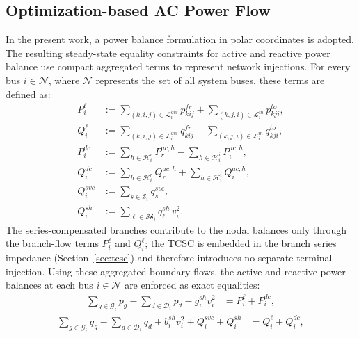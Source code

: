 \documentclass[letterpaper,journal]{IEEEtran}
\begin{document}
\subsection{Optimization-based AC Power Flow}
\label{sec:OB-ACPF}
In the present work, a power balance formulation in polar coordinates is adopted. The resulting steady-state equality constraints for active
and reactive power balance use compact aggregated terms to represent network injections. For every bus $i \in \mathcal{N}$, where $\mathcal{N}$
represents the set of all system buses, these terms are defined as:
\begin{align}
	P_i^{\ell} & := \sum_{(k,i,j)\in\mathcal{L}_i^{out}} p^{fr}_{kij} + \sum_{(k,j,i)\in\mathcal{L}_i^{in}}  p^{to}_{kji},   \\
	Q_i^{\ell} & := \sum_{(k,i,j)\in\mathcal{L}_i^{out}} q^{fr}_{kij} + \sum_{(k,j,i)\in\mathcal{L}_i^{in}}  q^{to}_{kji},   \\
	P_i^{dc}   & := \sum_{h\in\mathcal{H}_i^{r}} P^{ac,h}_{r} - \sum_{h\in\mathcal{H}_i^{i}} P^{ac,h}_{i},                   \\
	Q_i^{dc}   & := \sum_{h\in\mathcal{H}_i^{r}} Q^{ac,h}_{r} + \sum_{h\in\mathcal{H}_i^{i}} Q^{ac,h}_{i},                   \\
	Q_i^{svc}  & := \sum_{s\in\mathcal{S}_i} q^{svc}_s,                                                                      \\
	Q_i^{sh}   & := \sum_{\ell\in\mathcal{Sh}_i} q^{sh}_\ell \, v_i^2.
\end{align}
The series-compensated branches contribute to the nodal balances only through the branch-flow terms $P_i^{\ell}$ and $Q_i^{\ell}$;
the TCSC is embedded in the branch series impedance (Section~\ref{sec:tcsc}) and therefore introduces no separate terminal injection.
Using these aggregated boundary flows, the active and reactive power balances at each bus $i \in \mathcal{N}$ are enforced as
exact equalities:
\begin{equation}
	\begin{split}
		\sum_{g\in\mathcal{G}_i} p_g - \sum_{d\in\mathcal{D}_i} p_d - g_i^{sh}v_i^2
		& = P_i^{\ell} + P_i^{dc},
	\end{split}
	\label{eq:power_flow_1}
\end{equation}
\begin{equation}
	\begin{split}
		\sum_{g\in\mathcal{G}_i} q_g - \sum_{d\in\mathcal{D}_i} q_d + b_i^{sh}v_i^2 + Q_i^{svc} + Q_i^{sh}
		& = Q_i^{\ell} + Q_i^{dc},
	\end{split}
	\label{eq:power_flow_2}
\end{equation}
\end{document}
